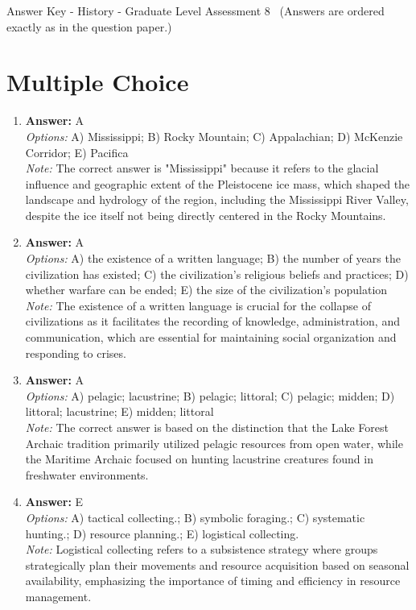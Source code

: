 \documentclass[12pt]{article}
\begin{document}
\begin{center}
Answer Key - History - Graduate Level Assessment 8 \
\small (Answers are ordered exactly as in the question paper.)
\end{center}

\section*{Multiple Choice}
\begin{enumerate}[label=\arabic*.]
\item \textbf{Answer:} A
\\ \textit{Options:} A) Mississippi; B) Rocky Mountain; C) Appalachian; D) McKenzie Corridor; E) Pacifica
\\ \textit{Note:} The correct answer is "Mississippi" because it refers to the glacial influence and geographic extent of the Pleistocene ice mass, which shaped the landscape and hydrology of the region, including the Mississippi River Valley, despite the ice itself not being directly centered in the Rocky Mountains.
\item \textbf{Answer:} A
\\ \textit{Options:} A) the existence of a written language; B) the number of years the civilization has existed; C) the civilization's religious beliefs and practices; D) whether warfare can be ended; E) the size of the civilization's population
\\ \textit{Note:} The existence of a written language is crucial for the collapse of civilizations as it facilitates the recording of knowledge, administration, and communication, which are essential for maintaining social organization and responding to crises.
\item \textbf{Answer:} A
\\ \textit{Options:} A) pelagic; lacustrine; B) pelagic; littoral; C) pelagic; midden; D) littoral; lacustrine; E) midden; littoral
\\ \textit{Note:} The correct answer is based on the distinction that the Lake Forest Archaic tradition primarily utilized pelagic resources from open water, while the Maritime Archaic focused on hunting lacustrine creatures found in freshwater environments.
\item \textbf{Answer:} E
\\ \textit{Options:} A) tactical collecting.; B) symbolic foraging.; C) systematic hunting.; D) resource planning.; E) logistical collecting.
\\ \textit{Note:} Logistical collecting refers to a subsistence strategy where groups strategically plan their movements and resource acquisition based on seasonal availability, emphasizing the importance of timing and efficiency in resource management.

\end{enumerate}
\end{document}
